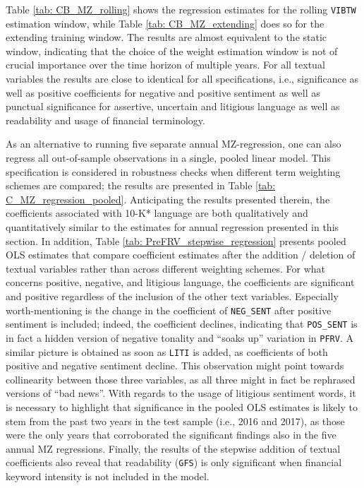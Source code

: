 
Table \ref{tab: CB_MZ_rolling} shows the regression estimates for the rolling \texttt{VIBTW} estimation window, while Table \ref{tab: CB_MZ_extending} does so for the extending training window. The results are almost equivalent to the static window, indicating that the choice of the weight estimation window is not of crucial importance over the time horizon of multiple years. For all textual variables the results are close to identical for all specifications, i.e., significance as well as positive coefficients for negative and positive sentiment as well as punctual significance for assertive, uncertain and litigious language as well as readability and usage of financial terminology. 

As an alternative to running five separate annual MZ-regression, one can also regress all out-of-sample observations in a single, pooled linear model. This specification is considered in robustness checks when different term weighting schemes are compared; the results are presented in Table \ref{tab: C_MZ_regression_pooled}. Anticipating the results presented therein, the coefficients associated with 10-K* language are both qualitatively and quantitatively similar to the estimates for annual regression presented in this section. In addition, Table \ref{tab: PreFRV_stepwise_regression} presents pooled OLS estimates that compare coefficient estimates after the addition / deletion of textual variables rather than across different weighting schemes. For what concerns positive, negative, and litigious language, the coefficients are significant and positive regardless of the inclusion of the other text variables. Especially worth-mentioning is the change in the coefficient of \texttt{NEG\_SENT} after positive sentiment is included; indeed, the coefficient declines, indicating that \texttt{POS\_SENT} is in fact a hidden version of negative tonality and \enquote{soaks up} variation in \texttt{PFRV}. A similar picture is obtained as soon as \texttt{LITI} is added, as coefficients of both positive and negative sentiment decline. This observation might point towards collinearity between those three variables, as all three might in fact be rephrased versions of \enquote{bad news}. With regards to the usage of litigious sentiment words, it is necessary to highlight that significance in the pooled OLS estimates is likely to stem from the past two years in the test sample (i.e., 2016 and 2017), as those were the only years that corroborated the significant findings also in the five annual MZ regressions. Finally, the results of the stepwise addition of textual coefficients also reveal that readability (\texttt{GFS}) is only significant when financial keyword intensity is not included in the model.

